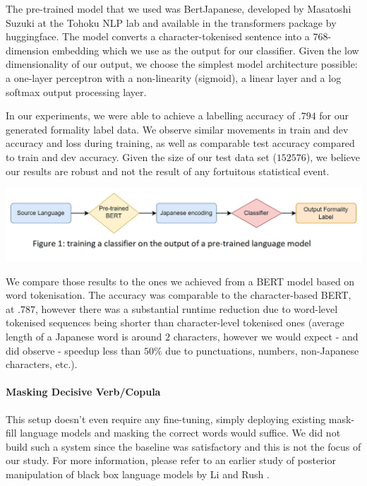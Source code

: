\documentclass[11pt]{article}
\begin{document}
The pre-trained model that we used was BertJapanese, developed by Masatoshi Suzuki at the Tohoku NLP lab and available in the transformers package by huggingface. The model converts a character-tokenised sentence into a $768$-dimension embedding which we use as the output for our classifier. Given the low dimensionality of our output, we choose the simplest model architecture possible: a one-layer perceptron with a non-linearity (sigmoid), a linear layer and a log softmax output processing layer.

In our experiments, we were able to achieve a labelling accuracy of $.794$ for our generated formality label data. We observe similar movements in train and dev accuracy and loss during training, as well as comparable test accuracy compared to train and dev accuracy. Given the size of our test data set ($152576$), we believe our results are robust and not the result of any fortuitous statistical event.

\includegraphics{images/pre-trained.jpg}

We compare those results to the ones we achieved from a BERT model based on word tokenisation. The accuracy was comparable to the character-based BERT, at $.787$, however there was a substantial runtime reduction due to word-level tokenised sequences being shorter than character-level tokenised ones (average length of a Japanese word is around $2$ characters, however we would expect - and did observe - speedup less than $50\%$ due to punctuations, numbers, non-Japanese characters, etc.). 

\paragraph{Masking Decisive Verb/Copula}

This setup doesn't even require any fine-tuning, simply deploying existing mask-fill language models and masking the correct words would suffice. We did not build such a system since the baseline was satisfactory and this is not the focus of our study. For more information, please refer to an earlier study of posterior manipulation of black box language models by Li and Rush \cite{DBLP:journals/corr/abs-2005-04560}.
\end{document}
